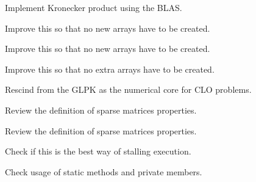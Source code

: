 
\begin{DoxyRefList}
\item[\label{todo__todo000001}%
\hypertarget{todo__todo000001}{}%
Member \hyperlink{classmtk_1_1DenseMatrix_a01d3d8bd502870f93bf3a88a0cc5fb49}{mtk\+:\+:Dense\+Matrix\+:\+:Kron} (const Dense\+Matrix \&aa, const Dense\+Matrix \&bb)]Implement Kronecker product using the B\+L\+A\+S.  
\item[\label{todo__todo000014}%
\hypertarget{todo__todo000014}{}%
Member \hyperlink{classmtk_1_1DenseMatrix_a59b9bea24acf39dca64e8549b3527463}{mtk\+:\+:Dense\+Matrix\+:\+:Order\+Col\+Major} ()]Improve this so that no new arrays have to be created.  
\item[\label{todo__todo000013}%
\hypertarget{todo__todo000013}{}%
Member \hyperlink{classmtk_1_1DenseMatrix_ac2949efba3e8278335d45418c85433e4}{mtk\+:\+:Dense\+Matrix\+:\+:Order\+Row\+Major} ()]Improve this so that no new arrays have to be created.  
\item[\label{todo__todo000012}%
\hypertarget{todo__todo000012}{}%
Member \hyperlink{classmtk_1_1DenseMatrix_a71d9c07ca66e88d97d1fd5012f43138b}{mtk\+:\+:Dense\+Matrix\+:\+:Transpose} ()]Improve this so that no extra arrays have to be created.  
\item[\label{todo__todo000002}%
\hypertarget{todo__todo000002}{}%
Class \hyperlink{classmtk_1_1GLPKAdapter}{mtk\+:\+:G\+L\+P\+K\+Adapter} ]Rescind from the G\+L\+P\+K as the numerical core for C\+L\+O problems.  
\item[\label{todo__todo000021}%
\hypertarget{todo__todo000021}{}%
Member \hyperlink{classmtk_1_1Matrix_af4bba5c43d1f09f5059a04298ba24568}{mtk\+:\+:Matrix\+:\+:Increase\+Num\+Null} () noexcept]Review the definition of sparse matrices properties.  
\item[\label{todo__todo000020}%
\hypertarget{todo__todo000020}{}%
Member \hyperlink{classmtk_1_1Matrix_ace7cb5c31d0de66b8f9c63cd542c9e63}{mtk\+:\+:Matrix\+:\+:Increase\+Num\+Zero} () noexcept]Review the definition of sparse matrices properties.  
\item[\label{todo__todo000022}%
\hypertarget{todo__todo000022}{}%
Member \hyperlink{classmtk_1_1Tools_a332324c6f25e66be9dff48c5987a3b9f}{mtk\+:\+:Tools\+:\+:Prevent} (const bool complement, const char $\ast$const fname, int lineno, const char $\ast$const fxname) noexcept]Check if this is the best way of stalling execution.  
\item[\label{todo__todo000023}%
\hypertarget{todo__todo000023}{}%
Member \hyperlink{classmtk_1_1Tools_a04a60458594336ee1badff79b8a9a77f}{mtk\+:\+:Tools\+:\+:test\+\_\+number\+\_\+} ]Check usage of static methods and private members.  

\end{DoxyRefList}
